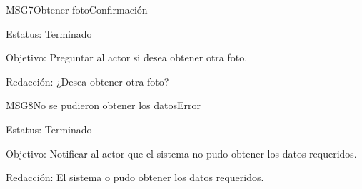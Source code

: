\begin{mensaje}{MSG7}{Obtener foto}{Confirmación}
	\item[Estatus:] Terminado
	\item[Objetivo:] Preguntar al actor si desea obtener otra foto.
	\item[Redacción:] ¿Desea obtener otra foto?
\end{mensaje}

\begin{mensaje}{MSG8}{No se pudieron obtener los datos}{Error}
	\item[Estatus:] Terminado
	\item[Objetivo:] Notificar al actor que el sistema no pudo obtener los datos requeridos.
	\item[Redacción:] El sistema o pudo obtener los datos requeridos.
\end{mensaje}

